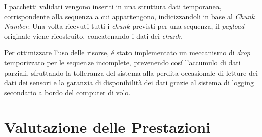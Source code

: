 \documentclass[12pt,a4paper,twoside]{book}
\begin{document}
I pacchetti validati vengono inseriti in una struttura dati temporanea, corrispondente
alla sequenza a cui appartengono, indicizzandoli in base al \emph{Chunk Number}.
Una volta ricevuti tutti i \emph{chunk} previsti per una sequenza, il \emph{payload}
originale viene ricostruito, concatenando i dati dei \emph{chunk}.

Per ottimizzare l'uso delle risorse, \'e stato implementato un meccanismo di \emph{drop}
temporizzato per le sequenze incomplete, prevenendo cos\'i l'accumulo di dati parziali,
sfruttando la tolleranza del sistema alla perdita occasionale di letture dei dati
dei sensori e la garanzia di disponibilità dei dati grazie al sistema di logging secondario a
bordo del computer di volo.
\chapter{Valutazione delle Prestazioni} \label{chap:performance}
\vspace{-0.5cm}
\end{document}
